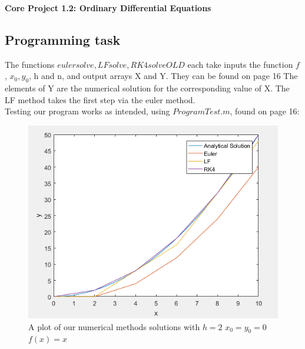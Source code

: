 \documentclass[10pt,a4paper]{report}
\begin{document}
\textbf{Core Project 1.2: Ordinary Differential Equations}
\thispagestyle{empty}

\newpage


\subsection*{Programming task}

The functions $eulersolve, LFsolve, RK4solveOLD$ each take inputs the function $f$, $x_0, y_0$, h and n, and output arrays X and Y. They can be found on page 16 The elements of Y are the numerical solution for the corresponding value of X. The LF method takes the first step via the euler method. \\

Testing our program works as intended, using $ProgramTest.m$, found on page 16: 

\begin{figure}[H]
\centering
\includegraphics[scale=0.8]{test}
\caption{A plot of our numerical methods solutions with $h=2$ $x_0=y_0=0$ $f(x)=x$}
\end{figure}
\end{document}
